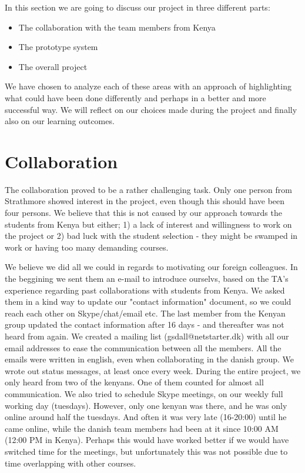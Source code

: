 
In this section we are going to discuss our project in three different parts:

\begin{itemize}
	\item The collaboration with the team members from Kenya
	\item The prototype system
	\item The overall project
\end{itemize}

We have chosen to analyze each of these areas with an approach of highlighting what could have been done differently and perhaps in a better and more successful way. We will reflect on our choices made during the project and finally also on our learning outcomes.


\section{Collaboration}\label{sec:discussioncollaboration}
The collaboration proved to be a rather challenging task. Only one person from Strathmore showed interest in the project, even though this should have been four persons. We believe that this is not caused by our approach towards the students from Kenya but either; 1) a lack of interest and willingness to work on the project or 2) bad luck with the student selection - they might be swamped in work or having too many demanding courses.

We believe we did all we could in regards to motivating our foreign colleagues. In the beggining we sent them an e-mail to introduce ourselvs, based on the TA's experience regarding past collaborations with students from Kenya. We asked them in a kind way to update our "contact information" document, so we could reach each other on Skype/chat/email etc. The last member from the Kenyan group updated the contact information after 16 days - and thereafter was not heard from again. We created a mailing list (gsdall@netstarter.dk) with all our email addresses to ease the communication between all the members. All the emails were written in english, even when collaborating in the danish group. We wrote out status messages, at least once every week. During the entire project, we only heard from two of the kenyans. One of them counted for almost all communication. We also tried to schedule Skype meetings, on our weekly full working day (tuesdays). However, only one kenyan was there, and he was only online around half the tuesdays. And often it was very late (16-20:00) until he came online, while the danish team members had been at it since 10:00 AM (12:00 PM in Kenya). Perhaps this would have worked better if we would have switched time for the meetings, but unfortunately this was not possible due to time overlapping with other courses.

